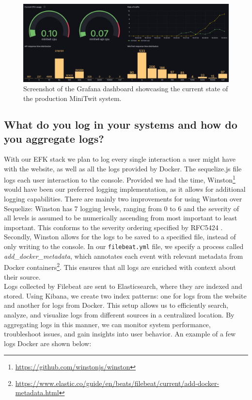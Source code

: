 \documentclass[11pt]{article}
\begin{document}
\begin{figure}[h]
    \centering
    \includegraphics[width=0.75\linewidth]{images/grafana.png}
    \caption{Screenshot of the Grafana dashboard showcasing the current state of the production MiniTwit system.}
    \label{fig:grafana}
\end{figure}



\subsection{What do you log in your systems and how do you aggregate logs?}
With our EFK stack we plan to log every single interaction a user might have with the website, as well as all the logs provided by Docker. The sequelize.js file logs each user interaction to the console. Provided we had the time, Winston\footnote{\url{https://github.com/winstonjs/winston}} would have been our preferred logging implementation, as it allows for additional logging capabilities. There are mainly two improvements for using Winston over Sequelize: Winston has 7 logging levels, ranging from 0 to 6 and the severity of all levels is assumed to be numerically ascending from most important to least important. This conforms to the severity ordering specified by RFC5424 \citep{rfc5424}. Secondly, Winston allows for the logs to be saved to a specified file, instead of only writing to the console. 
In our \texttt{filebeat.yml} file, we specify a process called \textit{add\_docker\_metadata}, which annotates each event with relevant metadata from Docker containers\footnote{\url{https://www.elastic.co/guide/en/beats/filebeat/current/add-docker-metadata.html}}. This ensures that all logs are enriched with context about their source.\\
Logs collected by Filebeat are sent to Elasticsearch, where they are indexed and stored. Using Kibana, we create two index patterns: one for logs from the website and another for logs from Docker. This setup allows us to efficiently search, analyze, and visualize logs from different sources in a centralized location. By aggregating logs in this manner, we can monitor system performance, troubleshoot issues, and gain insights into user behavior. An example of a few logs Docker are shown below:
\end{document}
